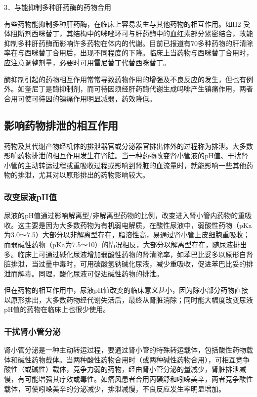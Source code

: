 3．与能抑制多种肝药酶的药物合用

有些药物能抑制多种肝药酶，在临床上容易发生与其他药物的相互作用。如H{2}
受体阻断剂西咪替丁，其结构中的咪唑环可与肝药酶中的血红素部分紧密结合，故能抑制多种肝药酶而影响许多药物在体内的代谢。目前已报道有70多种药物的肝清除率在与西咪替丁合用后，出现不同程度的下降。临床上当药物与西咪替丁合用时，应注意调整剂量，必要时可用雷尼替丁代替西咪替丁。

酶抑制引起的药物相互作用常常导致药物作用的增强及不良反应的发生，但也有例外。如奎尼丁是酶抑制剂，而可待因须经肝药酶代谢生成吗啡产生镇痛作用，两者合用可使可待因的镇痛作用明显减弱，药效降低。

\subsection{影响药物排泄的相互作用}

药物及其代谢产物经机体的排泄器官或分泌器官排出体外的过程称为排泄。大多数影响药物排泄的相互作用发生在肾脏。当一种药物改变肾小管液的pH值、干扰肾小管的主动转运过程或重吸收过程或影响到肾脏的血流量时，就能影响一些其他药物的排泄，尤其对以原形排出的药物影响较大。

\subsubsection{改变尿液pH值}

尿液的pH值通过影响解离型/非解离型药物的比例，改变进入肾小管内药物的重吸收。这主要是因为大多数药物为有机弱电解质，在酸性尿液中，弱酸性药物（pKa为3.0～7.5）大部分以非解离型存在，脂溶性高，易通过肾小管上皮细胞重吸收；而弱碱性药物（pKa为7.5～10）的情况相反，大部分以解离型存在，随尿液排出多。临床上可通过碱化尿液增加弱酸性药物的肾清除率，如苯巴比妥多以原形自肾脏排泄，当过量中毒时，可用碳酸氢钠碱化尿液，减少重吸收，促进苯巴比妥的排泄而解毒。同理，酸化尿液可促进碱性药物的排泄。

但在药物的相互作用中，尿液pH值改变的临床意义甚小，因为除小部分药物直接以原形排出，大多数药物经代谢失活后，最终从肾脏消除；同时能大幅度改变尿液pH值的药物在临床上也很少使用。

\subsubsection{干扰肾小管分泌}

肾小管分泌是一种主动转运过程，要通过肾小管的特殊转运载体，包括酸性药物载体和碱性药物载体。当两种酸性药物合用时（或两种碱性药物合用），可相互竞争酸性（或碱性）载体，竞争力弱的药物，经由肾小管分泌的量减少，肾脏排泄减慢，有可能增强其疗效或毒性。如痛风患者合用丙磺舒和吲哚美辛，两者竞争酸性载体，可使吲哚美辛的分泌减少，排泄减慢，不良反应发生率明显增加。

